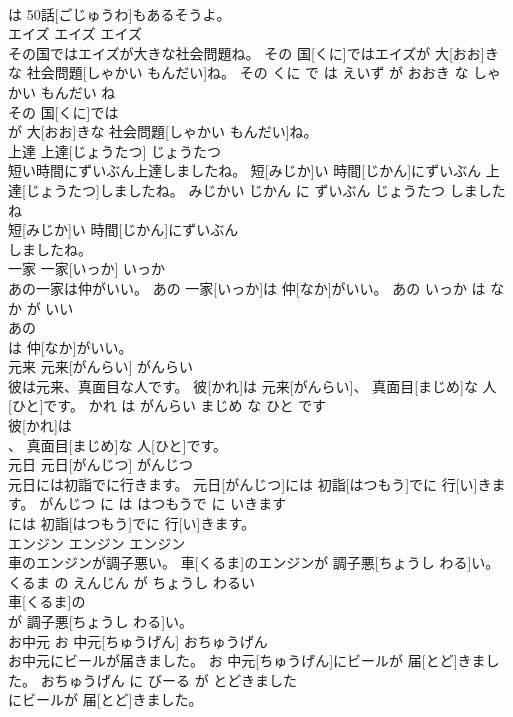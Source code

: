 \documentclass[8pt]{extreport}
\begin{document}
\begin{CJK}{UTF8}{min}
\\	は 50話[ごじゅうわ]もあるそうよ。			
\\	エイズ	エイズ	エイズ	
\\	その国ではエイズが大きな社会問題ね。	その 国[くに]ではエイズが 大[おお]きな 社会問題[しゃかい もんだい]ね。	その くに で は えいず が おおき な しゃかい もんだい ね	
\\	その 国[くに]では
\\	が 大[おお]きな 社会問題[しゃかい もんだい]ね。			
\\	上達	上達[じょうたつ]	じょうたつ	
\\	短い時間にずいぶん上達しましたね。	短[みじか]い 時間[じかん]にずいぶん 上達[じょうたつ]しましたね。	みじかい じかん に ずいぶん じょうたつ しました ね	
\\	短[みじか]い 時間[じかん]にずいぶん
\\	しましたね。			
\\	一家	一家[いっか]	いっか	
\\	あの一家は仲がいい。	あの 一家[いっか]は 仲[なか]がいい。	あの いっか は なか が いい	
\\	あの
\\	は 仲[なか]がいい。			
\\	元来	元来[がんらい]	がんらい	
\\	彼は元来、真面目な人です。	彼[かれ]は 元来[がんらい]、 真面目[まじめ]な 人[ひと]です。	かれ は がんらい まじめ な ひと です	
\\	彼[かれ]は
\\	、 真面目[まじめ]な 人[ひと]です。			
\\	元日	元日[がんじつ]	がんじつ	
\\	元日には初詣でに行きます。	元日[がんじつ]には 初詣[はつもう]でに 行[い]きます。	がんじつ に は はつもうで に いきます	
\\	には 初詣[はつもう]でに 行[い]きます。			
\\	エンジン	エンジン	エンジン	
\\	車のエンジンが調子悪い。	車[くるま]のエンジンが 調子悪[ちょうし わる]い。	くるま の えんじん が ちょうし わるい	
\\	車[くるま]の
\\	が 調子悪[ちょうし わる]い。			
\\	お中元	お 中元[ちゅうげん]	おちゅうげん	
\\	お中元にビールが届きました。	お 中元[ちゅうげん]にビールが 届[とど]きました。	おちゅうげん に びーる が とどきました	
\\	にビールが 届[とど]きました。			

\end{CJK}
\end{document}
